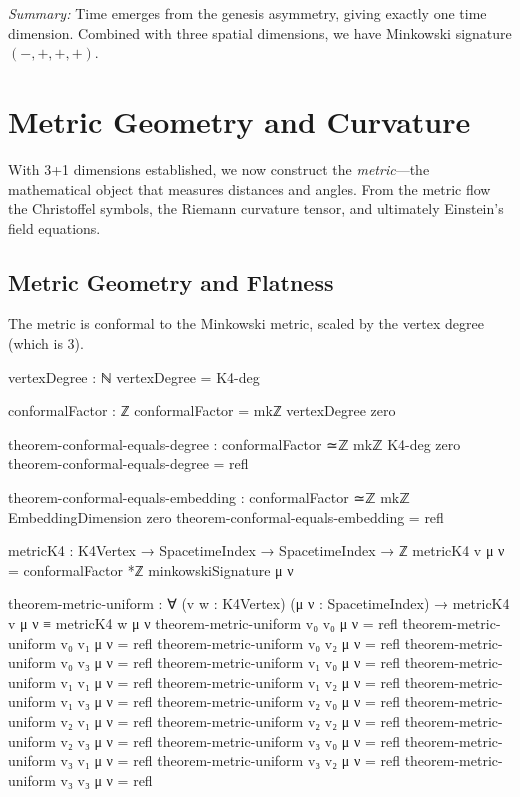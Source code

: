 \documentclass[11pt,a4paper]{book}
\begin{document}
\medskip
\noindent\textit{Summary:} Time emerges from the genesis asymmetry, giving exactly one time 
dimension. Combined with three spatial dimensions, we have Minkowski signature $(-,+,+,+)$.

\chapter{Metric Geometry and Curvature}
\label{chap:metric-curvature}

With 3+1 dimensions established, we now construct the \emph{metric}—the mathematical 
object that measures distances and angles. From the metric flow the Christoffel symbols, 
the Riemann curvature tensor, and ultimately Einstein's field equations.

\section{Metric Geometry and Flatness}

The metric is conformal to the Minkowski metric, scaled by the vertex degree (which is 3).

\begin{code}
vertexDegree : ℕ
vertexDegree = K4-deg

conformalFactor : ℤ
conformalFactor = mkℤ vertexDegree zero

theorem-conformal-equals-degree : conformalFactor ≃ℤ mkℤ K4-deg zero
theorem-conformal-equals-degree = refl

theorem-conformal-equals-embedding : conformalFactor ≃ℤ mkℤ EmbeddingDimension zero
theorem-conformal-equals-embedding = refl

metricK4 : K4Vertex → SpacetimeIndex → SpacetimeIndex → ℤ
metricK4 v μ ν = conformalFactor *ℤ minkowskiSignature μ ν
\end{code}

\begin{code}
theorem-metric-uniform : ∀ (v w : K4Vertex) (μ ν : SpacetimeIndex) →
  metricK4 v μ ν ≡ metricK4 w μ ν
theorem-metric-uniform v₀ v₀ μ ν = refl
theorem-metric-uniform v₀ v₁ μ ν = refl
theorem-metric-uniform v₀ v₂ μ ν = refl
theorem-metric-uniform v₀ v₃ μ ν = refl
theorem-metric-uniform v₁ v₀ μ ν = refl
theorem-metric-uniform v₁ v₁ μ ν = refl
theorem-metric-uniform v₁ v₂ μ ν = refl
theorem-metric-uniform v₁ v₃ μ ν = refl
theorem-metric-uniform v₂ v₀ μ ν = refl
theorem-metric-uniform v₂ v₁ μ ν = refl
theorem-metric-uniform v₂ v₂ μ ν = refl
theorem-metric-uniform v₂ v₃ μ ν = refl
theorem-metric-uniform v₃ v₀ μ ν = refl
theorem-metric-uniform v₃ v₁ μ ν = refl
theorem-metric-uniform v₃ v₂ μ ν = refl
theorem-metric-uniform v₃ v₃ μ ν = refl
\end{code}
\end{document}
